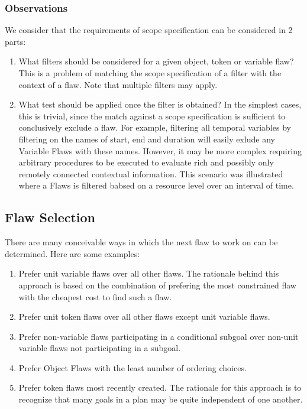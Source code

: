 \documentclass[10pt, letterpaper, oneside]{article}
\begin{document}
\subsubsection{Observations}
We consider that the requirements of scope specification can be considered in 2 parts:
\begin{enumerate}
\item What filters should be considered for a given object, token or variable flaw? This is a problem of matching the scope specification of a filter with the context of a flaw. Note that multiple filters may apply.
\item What test should be applied once the filter is obtained? In the simplest cases, this is trivial, since the match against a scope specification is sufficient to conclusively exclude a flaw. For example, filtering all temporal variables by filtering on the names of start, end and duration will easily exlude any Variable Flaws with these names. However, it may be more complex requiring arbitrary procedures to be executed to evaluate rich and possibly only remotely connected contextual information. This scenario was illustrated where a Flaws is filtered babsed on a resource level over an interval of time.
\end{enumerate}

\subsection{Flaw Selection}
There are many conceivable ways in which the next flaw to work on can be determined. Here are some examples:
\begin{enumerate}
\item Prefer unit variable flaws over all other flaws. The rationale behind this approach is based on the combination of prefering the most constrained flaw with the cheapest cost to find such a flaw.
\item Prefer unit token flaws over all other flaws except unit variable flaws.
\item Prefer non-variable flaws participating in a conditional subgoal over non-unit variable flaws not participating in a subgoal.
\item Prefer Object Flaws with the least number of ordering choices.
\item Prefer token flaws most recently created. The rationale for this approach is to recognize that many goals in a plan may be quite independent of one another. 
\end{enumerate}
\end{document}
